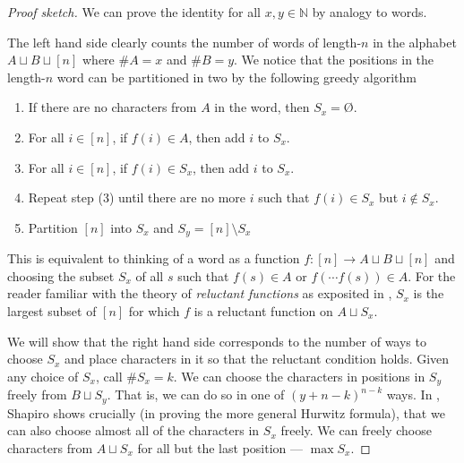 \documentclass[12 pt]{amsart}
\theoremstyle{definition} %
\theoremstyle{remark} %
\begin{document}
\begin{proof}[Proof sketch]
	We can prove the identity for all $x, y \in \mathbb{N}$ by analogy to words.

	The left hand side clearly counts the number of words of length-$n$ in the alphabet $A \sqcup B \sqcup [n]$ where $\# A = x$ and $\# B = y$. We notice that the positions in the length-$n$ word can be partitioned in two by the following greedy algorithm
	\begin{enumerate}
		\item If there are no characters from $A$ in the word, then $S_{x} = \text{\O}$.
		\item For all $i \in [n]$, if $f(i) \in A$, then add $i$ to $S_{x}$.
		\item For all $i \in [n]$, if $f(i) \in S_{x}$, then add $i$ to $S_{x}$.
		\item Repeat step (3) until there are no more $i$ such that $f(i) \in S_{x}$ but $i \notin S_{x}$.
		\item Partition $[n]$ into $S_{x}$ and $S_{y} = [n] \setminus S_{x}$
	\end{enumerate}
	This is equivalent to thinking of a word as a function $f : [n] \to A \sqcup B \sqcup [n]$ and choosing the subset $S_{x}$ of all $s$ such that $f(s) \in A$ or $f( \cdots f(s)) \in A$. For the reader familiar with the theory of \emph{reluctant functions} as exposited in \cite{mullin-rota-1970}, $S_{x}$ is the largest subset of $[n]$ for which $f$ is a reluctant function  on $A \sqcup S_{x}$.

	We will show that the right hand side corresponds to the number of ways to choose $S_{x}$ and place characters in it so that the reluctant condition holds. Given any choice of $S_{x}$, call $\# S_{x} = k$. We can choose the characters in positions in $S_{y}$ freely from $B \sqcup S_{y}$. That is, we can do so in one of $(y + n - k)^{n - k}$ ways. In \cite{shapiro-1991}, Shapiro shows crucially (in proving the more general Hurwitz formula), that we can also choose almost all of the characters in $S_{x}$ freely. We can freely choose characters from $A \sqcup S_{x}$ for all but the last position --- $\max S_{x}$.
	

\end{proof}
\end{document}
